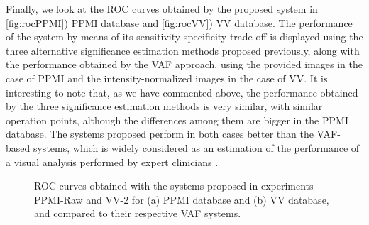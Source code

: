 	Finally, we look at the ROC curves obtained by the proposed system in \ref{fig:rocPPMI}) PPMI database and \ref{fig:rocVV}) VV database. The performance of the system by means of its sensitivity-specificity trade-off is displayed using the three alternative significance estimation methods proposed previously, along with the performance obtained by the VAF approach, using the provided images in the case of PPMI and the intensity-normalized images in the case of VV.  It is interesting to note that, as we have commented above, the performance obtained by the three significance estimation methods is very similar, with similar operation points, although the differences among them are bigger in the PPMI database. The systems proposed perform in both cases better than the VAF-based systems, which is widely considered as an estimation of the performance of a visual analysis performed by expert clinicians \cite{Stoeckel04}.
	
	\begin{figure}
		\centering
		
		\caption{ROC curves obtained with the systems proposed in experiments PPMI-Raw and VV-2 for (a) PPMI database and (b) VV database, and compared to their respective VAF systems. } 
		\label{fig:roccurve}
	\end{figure}
